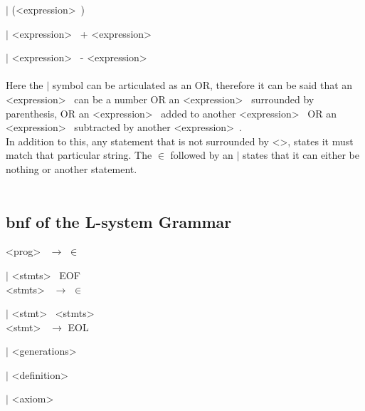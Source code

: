 \hspace{2cm} $|$ (\textless expression\textgreater~) 

\hspace{2cm} $|$ \textless expression\textgreater~ + \textless expression\textgreater~ 

\hspace{2cm} $|$ \textless expression\textgreater~ - \textless expression\textgreater~ \\
\\
Here the $|$ symbol can be articulated as an OR, therefore it can be said that an \textless expression\textgreater~ can be a number OR an \textless expression\textgreater~ surrounded by parenthesis, OR an \textless expression\textgreater~ added to another \textless expression\textgreater~ OR an \textless expression\textgreater~ subtracted by another \textless expression\textgreater~. 
\\
In addition to this, any statement that is not surrounded by \textless \textgreater, states it must match that particular string. The $\in$ followed by an $|$ states that it can either be nothing or another statement. \\
\\


\newpage 
\subsection{\acrlong{bnf} of the L-system Grammar}

\noindent
\textless prog\textgreater~ $\rightarrow$ $\in$ 

\hspace{2cm} $|$  \textless stmts\textgreater~ EOF \\



\noindent
\textless stmts\textgreater~ $\rightarrow$ $\in$

\hspace{2cm} $|$ \textless stmt\textgreater~ \textless stmts\textgreater~ \\


\noindent
\textless stmt\textgreater~ $\rightarrow$ EOL 

\hspace{2cm} $|$ \textless generations\textgreater~

\hspace{2cm} $|$ \textless definition\textgreater~

\hspace{2cm} $|$ \textless axiom\textgreater~


